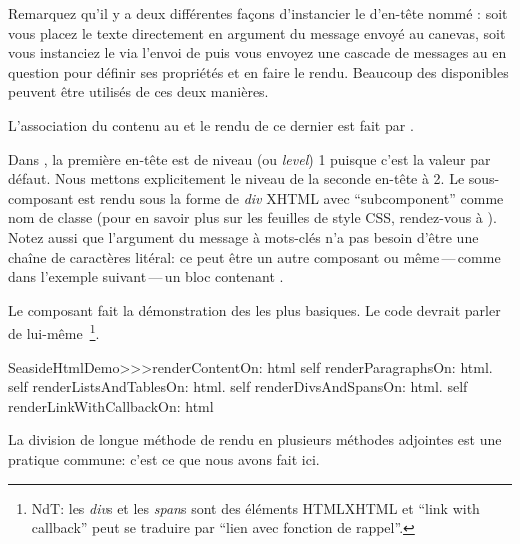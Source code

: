 \documentclass[a4paper,10pt,twoside]{book}
\begin{document}
Remarquez qu'il y a deux différentes façons d'instancier le \brush
d'en-tête nommé :
soit vous placez le texte directement en argument du message
envoyé au canevas,
soit vous instanciez le \brush via l'envoi de  puis 
vous envoyez une cascade de messages au \brush{} en question pour
définir ses propriétés et en faire le rendu.
Beaucoup des \brushes disponibles peuvent être utilisés de ces deux
manières.

L'association du contenu au \brush{} et le rendu de ce dernier est
fait par .

Dans , la première en-tête est de niveau
(ou \emph{level}) 1 puisque c'est la valeur par défaut.
Nous mettons explicitement le niveau de la seconde en-tête à 2.
Le sous-composant est rendu sous la forme de \emph{div} XHTML avec
``subcomponent'' comme nom de classe  (pour en savoir plus
sur les feuilles de style CSS, rendez-vous à ).
Notez aussi que l'argument du message à mots-clés  n'a pas
besoin d'être une chaîne de caractères litéral: ce peut être un autre
composant ou même\,---\,comme dans l'exemple suivant\,---\,un
bloc contenant .

Le composant  fait la démonstration des \brushes{}
les plus basiques.
Le code devrait parler de lui-même~\footnote{NdT: les \emph{div}{s} et
  les \emph{span}{s} sont des éléments HTML\/XHTML et ``link with
  callback'' peut se traduire par ``lien avec fonction de rappel''.}.


\begin{code}{}
SeasideHtmlDemo>>>renderContentOn: html 
	self renderParagraphsOn: html.
	self renderListsAndTablesOn: html.
	self renderDivsAndSpansOn: html.
	self renderLinkWithCallbackOn: html
\end{code}

La division de longue méthode de rendu en plusieurs méthodes adjointes
est une pratique commune: c'est ce que nous avons fait ici.

\end{document}
